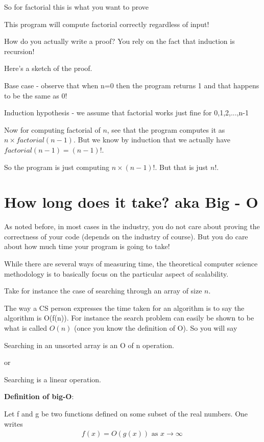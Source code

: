 \documentclass[12pt]{article}
\begin{document}
So for factorial this is what you want to prove

This program will compute factorial correctly regardless of input! 

How do you actually write a proof? You rely on the fact that induction is recursion!

Here's a sketch of the proof.

Base case - observe that when n=0 then the program returns 1 and that happens to be the same as 0!

Induction hypothesis - we assume that factorial works just fine for 0,1,2,...,n-1

Now for computing factorial of $n$, see that the program computes it as $n \times factorial(n-1)$. But we know by induction that we actually have $factorial(n-1) = (n-1)!$.

So the program is just computing $n \times (n-1)!$. But that is just $n!$.

\section*{How long does it take? aka Big - O}

As noted before, in most cases in the industry, you do not care about proving the correctness of your code (depends on the industry of course). But you do care about how much time your program is going to take!

While there are several ways of measuring time, the theoretical computer science methodology is to basically focus on the particular aspect of scalability. 

Take for instance the case of searching through an array of size $n$.

The way a CS person expresses the time taken for an algorithm is to say the algorithm is O(f(n)). For instance the search problem can easily be shown to be what is called $O(n)$ (once you know the definition of O). So you will say 

Searching in an unsorted array is an O of n operation. 

or 

Searching is a linear operation.

\textbf{Definition of big-O}: 

Let f and g be two functions defined on some subset of the real numbers. One writes
\begin{align*}
f(x)=O(g(x))\text{ as }x\to\infty\,
\end{align*}
\end{document}
